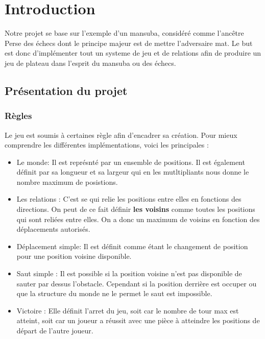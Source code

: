 \chapter{Introduction}
Notre projet se base sur l'exemple d'un mansuba, considéré comme l'ancêtre Perse des échecs dont le principe majeur est de mettre l'adversaire mat. Le but est donc d'implémenter tout un systeme de jeu et de relations afin de produire un jeu de plateau dans l'esprit du mansuba ou des échecs.


\section{Présentation du projet}
\subsection{Règles}
    Le jeu est soumis à certaines règle afin d'encadrer sa création. Pour mieux comprendre les différentes implémentations, voici les principales : \\
    \begin{itemize}
        \item[\textdagger] Le monde: Il est représnté par un ensemble de positions. Il est également définit par sa longueur et sa largeur qui en les mutltipliants nous donne le nombre maximum de posistions.\\
        
        \item[\textdagger] Les relations : C'est se qui relie les positions entre elles en fonctions des directions. On peut de ce fait définir \textbf{les voisins} comme toutes les positions qui sont reliées entre elles. On a donc un maximum de voisins en fonction des déplacements autorisés.
        \\
        \item[\textdagger] Déplacement simple: Il est définit comme étant le changement de position pour une position voisine disponible.
        \\
        \item[\textdagger] Saut simple : Il est possible si la position voisine n'est pas disponible de sauter par dessus l'obstacle. Cependant si la position derrière est occuper ou que la structure du monde ne le permet le saut est impossible.
        \\
        \item[\textdagger] Victoire : Elle définit l'arret du jeu, soit car le nombre de tour max est atteint, soit car un joueur a réussit avec une pièce à atteindre les positions de départ de l'autre joueur.
        \\
    \end{itemize}
